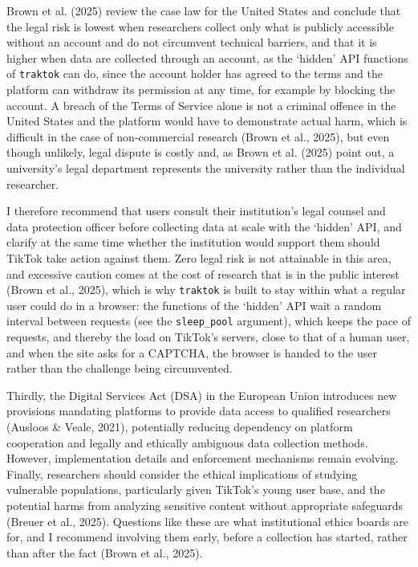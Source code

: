 \documentclass[
  nobib]{ccr}
\begin{document}
Brown et al. (2025) review the case law for the United States and
conclude that the legal risk is lowest when researchers collect only
what is publicly accessible without an account and do not circumvent
technical barriers, and that it is higher when data are collected
through an account, as the `hidden' API functions of \texttt{traktok}
can do, since the account holder has agreed to the terms and the
platform can withdraw its permission at any time, for example by
blocking the account. A breach of the Terms of Service alone is not a
criminal offence in the United States and the platform would have to
demonstrate actual harm, which is difficult in the case of
non-commercial research (Brown et al., 2025), but even though unlikely,
legal dispute is costly and, as Brown et al. (2025) point out, a
university's legal department represents the university rather than the
individual researcher.

I therefore recommend that users consult their institution's legal
counsel and data protection officer before collecting data at scale with
the `hidden' API, and clarify at the same time whether the institution
would support them should TikTok take action against them. Zero legal
risk is not attainable in this area, and excessive caution comes at the
cost of research that is in the public interest (Brown et al., 2025),
which is why \texttt{traktok} is built to stay within what a regular
user could do in a browser: the functions of the `hidden' API wait a
random interval between requests (see the \texttt{sleep\_pool}
argument), which keeps the pace of requests, and thereby the load on
TikTok's servers, close to that of a human user, and when the site asks
for a CAPTCHA, the browser is handed to the user rather than the
challenge being circumvented.

Thirdly, the Digital Services Act (DSA) in the European Union introduces
new provisions mandating platforms to provide data access to qualified
researchers (Ausloos \& Veale, 2021), potentially reducing dependency on
platform cooperation and legally and ethically ambiguous data collection
methods. However, implementation details and enforcement mechanisms
remain evolving. Finally, researchers should consider the ethical
implications of studying vulnerable populations, particularly given
TikTok's young user base, and the potential harms from analyzing
sensitive content without appropriate safeguards (Breuer et al., 2025).
Questions like these are what institutional ethics boards are for, and I
recommend involving them early, before a collection has started, rather
than after the fact (Brown et al., 2025).
\end{document}
